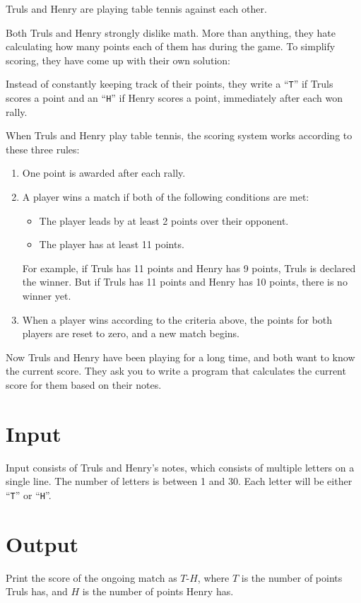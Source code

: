 
Truls and Henry are playing table tennis against each other.

Both Truls and Henry strongly dislike math.  
More than anything, they hate calculating how many points each of them has during the game.  
To simplify scoring, they have come up with their own solution:

Instead of constantly keeping track of their points, they write a ``\texttt{T}'' if Truls
scores a point and an ``\texttt{H}'' if Henry scores a point, immediately after each won rally.

When Truls and Henry play table tennis, the scoring system works according to these three rules:  
\begin{enumerate}
  \item One point is awarded after each rally.  
  \item A player wins a match if both of the following conditions are met:  
  \begin{itemize}
    \item The player leads by at least 2 points over their opponent.  
    \item The player has at least 11 points.  
  \end{itemize}  
  For example, if Truls has 11 points and Henry has 9 points, Truls is declared the winner.
  But if Truls has 11 points and Henry has 10 points, there is no winner yet.  

  \item When a player wins according to the criteria above, the points for both players are reset to zero, and a new match begins.  
\end{enumerate}  

Now Truls and Henry have been playing for a long time, and both want to know the current score.  
They ask you to write a program that calculates the current score for them based on their notes.

\section*{Input}
Input consists of Truls and Henry's notes, which consists of multiple letters on a single line. The number of letters is between 1 and 30.  
Each letter will be either ``\texttt{T}'' or ``\texttt{H}''.

\section*{Output}
Print the score of the ongoing match as $T$-$H$, where $T$ is
the number of points Truls has, and $H$ is the number of points Henry has.

